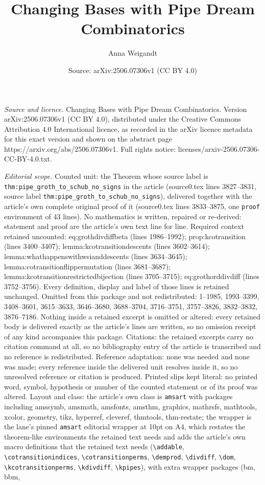 \documentclass[10pt,a4paper]{amsart}
\title[Changing Bases with Pipe Dream Combinatorics]{Changing Bases with Pipe Dream Combinatorics}
\author{Anna Weigandt}
\date{Source: arXiv:2506.07306v1 (CC BY 4.0)}
\begin{document}
\maketitle

\noindent\emph{Source and licence.} Changing Bases with Pipe Dream Combinatorics. Version arXiv:2506.07306v1 (CC BY 4.0), distributed under the Creative Commons Attribution 4.0 International licence, as recorded in the arXiv licence metadata for this exact version and shown on the abstract page https://arxiv.org/abs/2506.07306v1. Full rights notice: licenses/arxiv-2506.07306-CC-BY-4.0.txt.\par\smallskip

\noindent\textit{Editorial scope.} Counted unit: the Theorem whose source label is \texttt{thm:pipe\_groth\_to\_schub\_no\_signs} in the article (source0.tex lines 3827--3831, source label \texttt{thm:pipe\_groth\_to\_schub\_no\_signs}), delivered together with the article's own complete original proof of it (source0.tex lines 3833--3875, one \texttt{proof} environment of 43 lines). No mathematics is written, repaired or re-derived: statement and proof are the article's own text line for line. Required context retained uncounted: eq:grothdivdiffbeta (lines 1986--1992); prop:kcotransition (lines 3400--3407); lemma:kcotransitiondescents (lines 3602--3614); lemma:whathappenswithwsianddescents (lines 3634--3645); lemma:cotransitionflippermutation (lines 3681--3687); lemma:kcotransitionrestrictedbijection (lines 3705--3715); eq:grothorddivdiff (lines 3752--3756). Every definition, display and label of those lines is retained unchanged. Omitted from this package and not redistributed: 1--1985, 1993--3399, 3408--3601, 3615--3633, 3646--3680, 3688--3704, 3716--3751, 3757--3826, 3832--3832, 3876--7186. Nothing inside a retained excerpt is omitted or altered: every retained body is delivered exactly as the article's lines are written, so no omission receipt of any kind accompanies this package. Citations: the retained excerpts carry no citation command at all, so no bibliography entry of the article is transcribed and no reference is redistributed. Reference adaptation: none was needed and none was made; every reference inside the delivered unit resolves inside it, so no unresolved reference or citation is produced. Printed slips kept literal: no printed word, symbol, hypothesis or number of the counted statement or of its proof was altered. Layout and class: the article's own class is \texttt{amsart} with packages including amssymb, amsmath, amsfonts, amsthm, graphics, mathrsfs, mathtools, xcolor, geometry, tikz, hyperref, cleveref, thmtools, thm-restate; the wrapper is the lane's pinned \texttt{amsart} editorial wrapper at 10pt on A4, which restates the theorem-like environments the retained text needs and adds the article's own macro definitions that the retained text needs (\texttt{\textbackslash addable}, \texttt{\textbackslash cotransitionindices}, \texttt{\textbackslash cotransitionperms}, \texttt{\textbackslash demprod}, \texttt{\textbackslash divdiff}, \texttt{\textbackslash dom}, \texttt{\textbackslash kcotransitionperms}, \texttt{\textbackslash kdivdiff}, \texttt{\textbackslash kpipes}), with extra wrapper packages (bm, bbm, 
\end{document}
